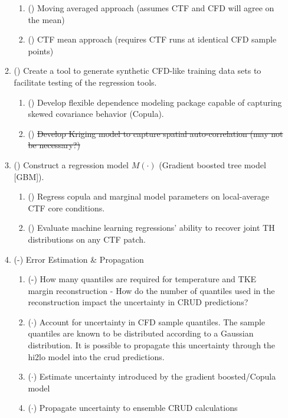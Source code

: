 \begin{enumerate}
\begin{enumerate}
        \begin{enumerate}
            \item (\checkmark) Moving averaged approach (assumes CTF and CFD will agree on the mean)
            \item (\checkmark) CTF mean approach (requires CTF runs at identical CFD sample points)
        \end{enumerate}
        \item (\checkmark) Create a tool to generate synthetic CFD-like training data sets to facilitate
            testing of the regression tools.
        \begin{enumerate}
            \item (\checkmark) Develop flexible dependence modeling package capable of capturing skewed covariance behavior (Copula).
            \item (\xmark) \sout{Develop Kriging model to capture spatial auto-correlation (may not be necessary?)}
        \end{enumerate}
        \item (\checkmark) Construct a regression model $M(\cdot)$ (Gradient boosted tree model [GBM]).
        \begin{enumerate}
            \item (\checkmark) Regress copula and marginal model parameters on local-average CTF core conditions.
            \item (\checkmark) Evaluate machine learning regressions' ability to recover joint TH distributions on any CTF patch.
        \end{enumerate}
        \item (\checkmark-) Error Estimation \& Propagation
        \begin{enumerate}
        	\item (\checkmark-) How many quantiles are required for temperature and TKE margin reconstruction
                                - How do the number of quantiles used in the reconstruction impact the uncertainty in CRUD predictions?
            \item ($\cdot$) {\color{blue} Account for uncertainty in CFD sample quantiles. The sample quantiles are known to be distributed according to a Gaussian distribution.  It is possible to propagate this uncertainty through the hi2lo model into the crud predictions.}
                \item ($\cdot$) {Estimate uncertainty introduced by the gradient boosted/Copula model}
            \item ($\cdot$) {Propagate uncertainty to ensemble CRUD calculations}

\end{enumerate}
\end{enumerate}
\end{enumerate}
